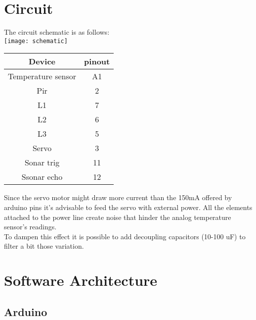 \section{Circuit}
The circuit schematic is as follows:\\
\texttt{[image: schematic]}
\begin{center}
    \begin{tabular}{|c|c|}
        \hline
        Device             & pinout \\
        \hline
        \hline
        Temperature sensor & A1     \\
        \hline
        Pir                & 2      \\
        \hline
        L1                 & 7      \\
        \hline
        L2                 & 6      \\
        \hline
        L3                 & 5      \\
        \hline
        Servo              & 3      \\
        \hline
        Sonar trig         & 11     \\
        \hline
        Ssonar echo        & 12     \\
        \hline
    \end{tabular}
\end{center}
Since the servo motor might draw more current than the 150mA offered by arduino pins it's advisable to feed the servo with external power.
All the elements attached to the power line create noise that hinder the analog temperature sensor's readings.\\
To dampen this effect it is possible to add decoupling capacitors (10-100 uF) to filter a bit those variation.
\pagebreak


\section{Software Architecture}
\subsection{Arduino}

